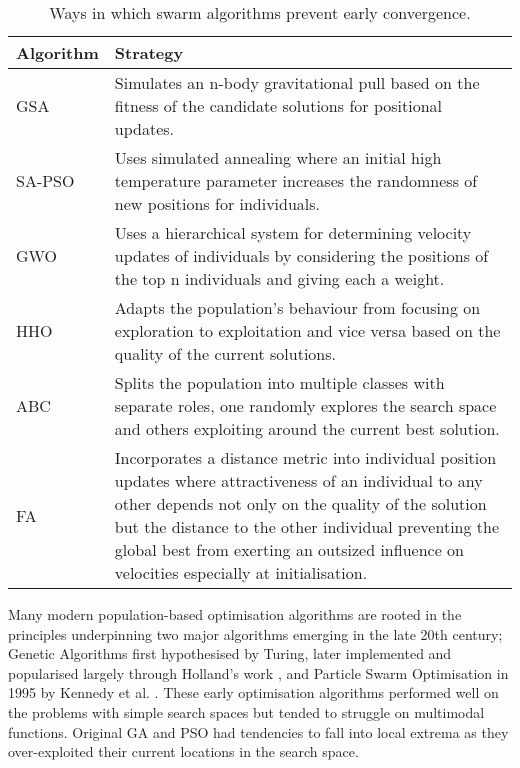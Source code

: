 \documentclass[a4paper, 12pt]{extarticle}
\begin{document}
\begin{table}[h!]
    \centering
    \begin{tabular}{l p{14cm}} 
        \toprule
        \textbf{Algorithm} & \textbf{Strategy}\\
        \midrule
        GSA         & Simulates an n-body gravitational pull based on the fitness of the candidate solutions for positional updates.\\
        SA-PSO      & Uses simulated annealing where an initial high temperature parameter increases the randomness of new positions for individuals.\\
        GWO         & Uses a hierarchical system for determining velocity updates of individuals by considering the positions of the top n individuals and giving each a weight. \\
        HHO         & Adapts the population's behaviour from focusing on exploration to exploitation and vice versa based on the quality of the current solutions. \\
        ABC         & Splits the population into multiple classes with separate roles, one randomly explores the search space and others exploiting around the current best solution. \\
        FA          & Incorporates a distance metric into individual position updates where attractiveness of an individual to any other depends not only on the quality of the solution but the distance to the other individual preventing the global best from exerting an outsized influence on velocities especially at initialisation. \\
        \bottomrule
    \end{tabular}
    \caption{Ways in which swarm algorithms prevent early convergence.}
    \label{tab:early}
\end{table}

Many modern population-based optimisation algorithms are rooted in the principles underpinning two major algorithms emerging in the late 20th century; Genetic Algorithms first hypothesised by Turing, later implemented and popularised largely through Holland's work \cite{holland1992genetic}, and Particle Swarm Optimisation in 1995 by Kennedy et al. \cite{kennedy1995particle}. These early optimisation algorithms performed well on the problems with simple search spaces but tended to struggle on multimodal functions. Original GA and PSO had tendencies to fall into local extrema as they over-exploited their current locations in the search space.
\end{document}
